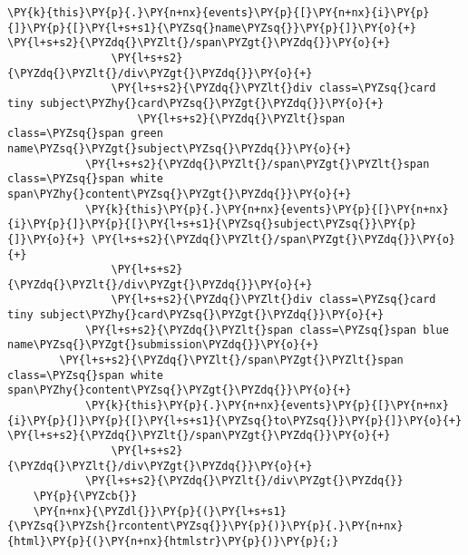 \begin{Verbatim}[commandchars=\\\{\}]
            \PY{k}{this}\PY{p}{.}\PY{n+nx}{events}\PY{p}{[}\PY{n+nx}{i}\PY{p}{]}\PY{p}{[}\PY{l+s+s1}{\PYZsq{}name\PYZsq{}}\PY{p}{]}\PY{o}{+} \PY{l+s+s2}{\PYZdq{}\PYZlt{}/span\PYZgt{}\PYZdq{}}\PY{o}{+}
                \PY{l+s+s2}{\PYZdq{}\PYZlt{}/div\PYZgt{}\PYZdq{}}\PY{o}{+}
                \PY{l+s+s2}{\PYZdq{}\PYZlt{}div class=\PYZsq{}card tiny subject\PYZhy{}card\PYZsq{}\PYZgt{}\PYZdq{}}\PY{o}{+}
                    \PY{l+s+s2}{\PYZdq{}\PYZlt{}span class=\PYZsq{}span green name\PYZsq{}\PYZgt{}subject\PYZsq{}\PYZdq{}}\PY{o}{+}
            \PY{l+s+s2}{\PYZdq{}\PYZlt{}/span\PYZgt{}\PYZlt{}span class=\PYZsq{}span white span\PYZhy{}content\PYZsq{}\PYZgt{}\PYZdq{}}\PY{o}{+}
            \PY{k}{this}\PY{p}{.}\PY{n+nx}{events}\PY{p}{[}\PY{n+nx}{i}\PY{p}{]}\PY{p}{[}\PY{l+s+s1}{\PYZsq{}subject\PYZsq{}}\PY{p}{]}\PY{o}{+} \PY{l+s+s2}{\PYZdq{}\PYZlt{}/span\PYZgt{}\PYZdq{}}\PY{o}{+}
                \PY{l+s+s2}{\PYZdq{}\PYZlt{}/div\PYZgt{}\PYZdq{}}\PY{o}{+}
                \PY{l+s+s2}{\PYZdq{}\PYZlt{}div class=\PYZsq{}card tiny subject\PYZhy{}card\PYZsq{}\PYZgt{}\PYZdq{}}\PY{o}{+}
            \PY{l+s+s2}{\PYZdq{}\PYZlt{}span class=\PYZsq{}span blue name\PYZsq{}\PYZgt{}submission\PYZdq{}}\PY{o}{+}
        \PY{l+s+s2}{\PYZdq{}\PYZlt{}/span\PYZgt{}\PYZlt{}span class=\PYZsq{}span white span\PYZhy{}content\PYZsq{}\PYZgt{}\PYZdq{}}\PY{o}{+}
            \PY{k}{this}\PY{p}{.}\PY{n+nx}{events}\PY{p}{[}\PY{n+nx}{i}\PY{p}{]}\PY{p}{[}\PY{l+s+s1}{\PYZsq{}to\PYZsq{}}\PY{p}{]}\PY{o}{+} \PY{l+s+s2}{\PYZdq{}\PYZlt{}/span\PYZgt{}\PYZdq{}}\PY{o}{+}
                \PY{l+s+s2}{\PYZdq{}\PYZlt{}/div\PYZgt{}\PYZdq{}}\PY{o}{+}
            \PY{l+s+s2}{\PYZdq{}\PYZlt{}/div\PYZgt{}\PYZdq{}}
    \PY{p}{\PYZcb{}}
    \PY{n+nx}{\PYZdl{}}\PY{p}{(}\PY{l+s+s1}{\PYZsq{}\PYZsh{}rcontent\PYZsq{}}\PY{p}{)}\PY{p}{.}\PY{n+nx}{html}\PY{p}{(}\PY{n+nx}{htmlstr}\PY{p}{)}\PY{p}{;}


\end{Verbatim}
